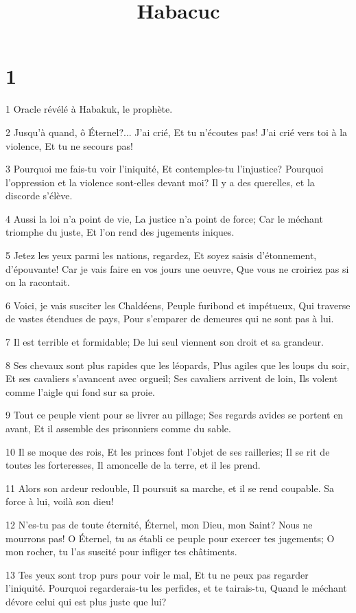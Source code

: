 

\title{Habacuc}


\chapter{1}

\par 1 Oracle révélé à Habakuk, le prophète.
\par 2 Jusqu'à quand, ô Éternel?... J'ai crié, Et tu n'écoutes pas! J'ai crié vers toi à la violence, Et tu ne secours pas!
\par 3 Pourquoi me fais-tu voir l'iniquité, Et contemples-tu l'injustice? Pourquoi l'oppression et la violence sont-elles devant moi? Il y a des querelles, et la discorde s'élève.
\par 4 Aussi la loi n'a point de vie, La justice n'a point de force; Car le méchant triomphe du juste, Et l'on rend des jugements iniques.
\par 5 Jetez les yeux parmi les nations, regardez, Et soyez saisis d'étonnement, d'épouvante! Car je vais faire en vos jours une oeuvre, Que vous ne croiriez pas si on la racontait.
\par 6 Voici, je vais susciter les Chaldéens, Peuple furibond et impétueux, Qui traverse de vastes étendues de pays, Pour s'emparer de demeures qui ne sont pas à lui.
\par 7 Il est terrible et formidable; De lui seul viennent son droit et sa grandeur.
\par 8 Ses chevaux sont plus rapides que les léopards, Plus agiles que les loups du soir, Et ses cavaliers s'avancent avec orgueil; Ses cavaliers arrivent de loin, Ils volent comme l'aigle qui fond sur sa proie.
\par 9 Tout ce peuple vient pour se livrer au pillage; Ses regards avides se portent en avant, Et il assemble des prisonniers comme du sable.
\par 10 Il se moque des rois, Et les princes font l'objet de ses railleries; Il se rit de toutes les forteresses, Il amoncelle de la terre, et il les prend.
\par 11 Alors son ardeur redouble, Il poursuit sa marche, et il se rend coupable. Sa force à lui, voilà son dieu!
\par 12 N'es-tu pas de toute éternité, Éternel, mon Dieu, mon Saint? Nous ne mourrons pas! O Éternel, tu as établi ce peuple pour exercer tes jugements; O mon rocher, tu l'as suscité pour infliger tes châtiments.
\par 13 Tes yeux sont trop purs pour voir le mal, Et tu ne peux pas regarder l'iniquité. Pourquoi regarderais-tu les perfides, et te tairais-tu, Quand le méchant dévore celui qui est plus juste que lui?
